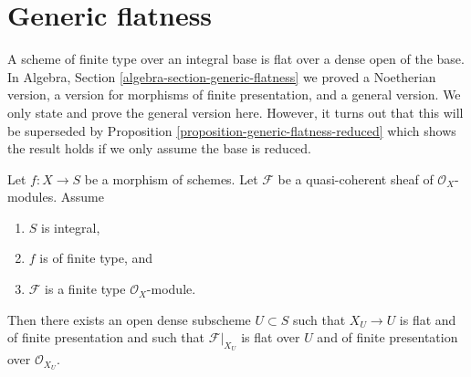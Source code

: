 \section{Generic flatness}
\label{section-generic-flatness}

\noindent
A scheme of finite type over an integral base is flat over a dense
open of the base. In
Algebra, Section \ref{algebra-section-generic-flatness}
we proved a Noetherian version, a version for morphisms of finite presentation,
and a general version. We only state and prove the general version here.
However, it turns out that this will be superseded by
Proposition \ref{proposition-generic-flatness-reduced}
which shows the result holds if we only assume the base is reduced.

\begin{proposition}
\label{proposition-generic-flatness}
Let $f : X \to S$ be a morphism of schemes.
Let $\mathcal{F}$ be a quasi-coherent sheaf of $\mathcal{O}_X$-modules.
Assume
\begin{enumerate}
\item $S$ is integral,
\item $f$ is of finite type, and
\item $\mathcal{F}$ is a finite type $\mathcal{O}_X$-module.
\end{enumerate}
Then there exists an open dense subscheme $U \subset S$ such that
$X_U \to U$ is flat and of finite presentation and such that
$\mathcal{F}|_{X_U}$ is flat over $U$ and of finite presentation
over $\mathcal{O}_{X_U}$.
\end{proposition}

